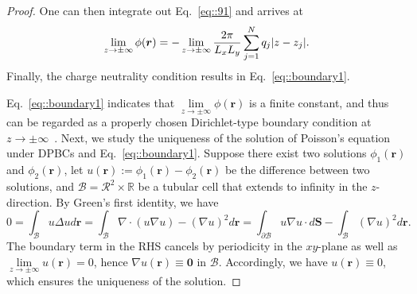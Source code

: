 \begin{proof}
	One can then integrate out Eq.~\eqref{eq::91} and arrives at
	\begin{equation}\label{eq::boundary2}
		\lim_{z \to \pm \infty} \phi(\bm{r}) = -\lim_{z \to \pm \infty} \frac{2\pi}{L_x L_y} \sum_{j = 1}^N q_j \lvert z - z_j\rvert.
	\end{equation}
	Finally, the charge neutrality condition results in Eq.~\eqref{eq::boundary1}. 
 
Eq.~\eqref{eq::boundary1} indicates that $\lim\limits_{z \to \pm \infty} \phi(\bm{r})$ is a finite constant, and thus can be regarded as a properly chosen Dirichlet-type boundary condition at $z\rightarrow\pm\infty$~\cite{lindbo2012fast}. 
Next, we study the uniqueness of the solution of Poisson's equation under DPBCs and Eq.~\eqref{eq::boundary1}. Suppose there exist two solutions $\phi_1(\bm{r})$ and $\phi_2(\bm{r})$,
let $u(\bm{r}):=\phi_1(\bm{r})-\phi_2(\bm{r})$ be the difference between two solutions, and $\mathcal{B}=\mathcal{R}^2\times\mathbb{R}$ be a tubular cell that extends to infinity in the $z$-direction. By Green's first identity, we have 
\begin{equation}
0=\int_{\mathcal{B}}u\Delta ud\bm{r}=\int_{\mathcal{B}}\nabla\cdot(u\nabla u)-(\nabla u)^2d\bm{r}=\int_{\partial\mathcal{B}}u\nabla u\cdot d\bm{S}-\int_{\mathcal{B}}\left(\nabla u\right)^2d\bm{r}.
\end{equation}
The boundary term in the RHS cancels by periodicity in the $xy$-plane as well as $\lim\limits_{z\rightarrow\pm\infty}u(\bm{r})=0$, hence $\nabla u(\bm{r})\equiv \bm{0}$ in $\mathcal{B}$. Accordingly, we have $u(\bm{r})\equiv 0$, which ensures the uniqueness of the solution.
  
\end{proof}

